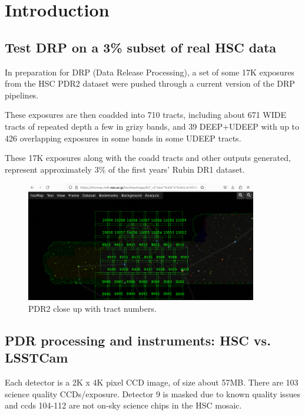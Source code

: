\section{Introduction}\label{sec:intro}

\subsection{Test DRP on a 3\% subset of real HSC data}

In preparation for DRP (Data Release Processing), a set of
some 17K exposures from the HSC PDR2 dataset were pushed through
a current version of the DRP pipelines.

These exposures are then coadded into 710 tracts, including about 671
WIDE tracts of repeated depth a few in grizy bands, and 39 DEEP+UDEEP with
up to 426 overlapping exposures in some bands in some UDEEP tracts.

These 17K exposures along with the coadd tracts and other
outputs generated, represent approximately 3\% of the first 
years' Rubin DR1 dataset.

 \begin{figure}
 \includegraphics[width=0.9\textwidth]{hscmaptractcosmos.png}
         \caption{PDR2 close up with tract numbers.  \label{fig:hscmaptract}}
 \end{figure}



\subsection{PDR processing and instruments: HSC vs. LSSTCam}

Each detector is a 2K x 4K pixel CCD image, of size about 57MB.
There are 103 science quality CCDs/exposure.  Detector 9 is masked due
to known quality issues and ccds 104-112 are not on-sky science chips in
the HSC mosaic.

